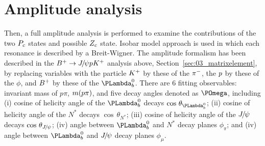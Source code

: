 \section{Amplitude analysis}

Then, a full amplitude analysis is performed to examine the contributions of the two $P_c$ states and possible $Z_c$ state.
Isobar model approach is used in which each resonance is described by a Breit-Wigner.
The amplitude formalism has been described in the ${{{B}^+}}\rightarrow{\ensuremath{{J\mskip -3mu/\mskip -2mu\psi}}}{\ensuremath{p}}{\ensuremath{{K}^+}}$ analysis above, Section~\ref{sec:03_matrixelement}, 
by replacing variables with the particle ${{K}^+}$ by these of the ${{\pi}^-}$,
the ${p}$ by these of the $\phi$,
and ${{{B}^+}}$ by these of the $\Lb$.
There are 6 fitting observables: invariant mass of $p\pi$, $m({p}\pi)$, 
and five decay angles denoted as $\POmega$, 
including
(i) cosine of helicity angle of the $\Lb$ decays $\cos\,\theta_{\Lb}$;
(ii) cosine of helicity angle of the $N^*$ decays $\cos\,\theta_{N^*}$;
(iii) cosine of helicity angle of the ${{J\mskip -3mu/\mskip -2mu\psi}}$ decays $\cos\,\theta_{{{J\mskip -3mu/\mskip -2mu\psi}}}$;
(iv) angle between $\Lb$ and $N^*$ decay planes $\phi_{\pi}$; and
(iv) angle between $\Lb$ and ${{J\mskip -3mu/\mskip -2mu\psi}}$ decay planes $\phi_{\mu}$.


